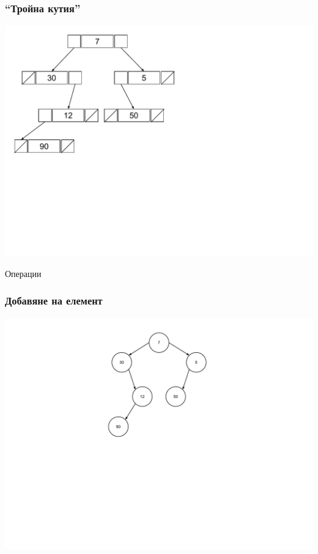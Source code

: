 \documentclass{beamer}
\begin{document}
\begin{frame}[fragile]
\frametitle{``Тройна кутия''}

\includegraphics[width=14cm]{images/tree_in_memory}

\end{frame}


\begin{frame}
\centerline{Операции}
\end{frame}

\begin{frame}[fragile]
\frametitle{Добавяне на елемент}

\includegraphics[width=14cm]{images/tree_arbitrary}

\end{frame}
\end{document}
